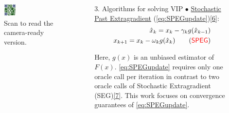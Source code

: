 \documentclass[24pt,final]{beamer}
\newlength{\onecolwid}
\newcommand{\algname}[1]{{{\sf  #1}}}
\begin{document}
\begin{frame}[t]
\begin{columns}[t]
\begin{column}{\onecolwid}
 

					
\vspace{-0.5cm}

\begin{figure}
            \centering
            \includegraphics[width=0.2\textwidth]{Figures/qr.png}
            \caption{Scan to read the camera-ready version.}
        \end{figure}


\end{column} 



 
		\begin{column}{\onecolwid} %

\begin{block}{3. Algorithms for solving VIP} 
 $\bullet$ \underline{Stochastic Past Extragradient} (\ref{eq:SPEGupdate})\href{https://link.springer.com/article/10.1007/BF01141092}{[6]}:
 \begin{align}
     \hat{x}_k = x_k - \gamma_k g(\hat{x}_{k - 1}) \nonumber \\
     x_{k+1} = x_k - \omega_k g(\hat{x}_k) \tag{\textcolor{red}{\algname{SPEG}}} \label{eq:SPEGupdate}
 \end{align}

Here, $g(x)$ is an unbiased estimator of $F(x)$. \ref{eq:SPEGupdate} requires only one oracle call per iteration in contrast to two oracle calls of Stochastic Extragradient (\algname{SEG})\href{https://cs.uwaterloo.ca/~y328yu/classics/extragrad.pdf}{[7]}. This work focuses on convergence guarantees of \ref{eq:SPEGupdate}.
\end{block}


\end{column}
\end{columns}
\end{frame}
\end{document}
